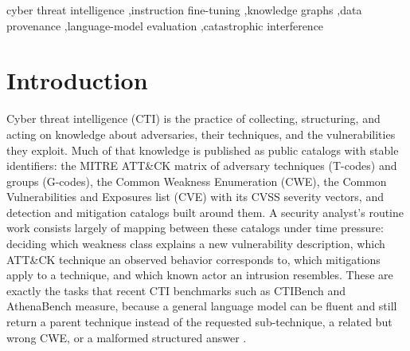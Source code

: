 \documentclass[preprint,12pt,authoryear]{elsarticle}
\makeatletter
\def\els@prelimauthors{}%
\newenvironment{highlights}{%
    \global\setbox\els@hlbox=\vbox\bgroup\hsize=\textwidth\def\baselinestretch{1}%
    \noindent{\Large Highlights}\par\vskip12pt
    \noindent\textbf{\@title}\par\vskip6pt
    \noindent{\let\corref\@gobble\let\fnref\@gobble\let\tnoteref\@gobble
      \def\els@prelimsep{\def\els@prelimsep{, }}\els@prelimauthors}\par\medskip
    \begin{itemize}}{\end{itemize}\egroup}%
\makeatother
\begin{document}
\begin{frontmatter}

\begin{keyword}
cyber threat intelligence \sep instruction fine-tuning \sep knowledge graphs \sep data provenance \sep language-model evaluation \sep catastrophic interference
\end{keyword}

\end{frontmatter}

\linenumbers

\section{Introduction}\label{sec:intro}
Cyber threat intelligence (CTI) is the practice of collecting, structuring, and acting on knowledge about adversaries, their techniques, and the vulnerabilities they exploit. Much of that knowledge is published as public catalogs with stable identifiers: the MITRE ATT\&CK matrix of adversary techniques (T-codes) and groups (G-codes), the Common Weakness Enumeration (CWE), the Common Vulnerabilities and Exposures list (CVE) with its CVSS severity vectors, and detection and mitigation catalogs built around them. A security analyst's routine work consists largely of mapping between these catalogs under time pressure: deciding which weakness class explains a new vulnerability description, which ATT\&CK technique an observed behavior corresponds to, which mitigations apply to a technique, and which known actor an intrusion resembles. These are exactly the tasks that recent CTI benchmarks such as CTIBench and AthenaBench measure, because a general language model can be fluent and still return a parent technique instead of the requested sub-technique, a related but wrong CWE, or a malformed structured answer \citep{alam2024ctibench,alam2025athenabench}.
\end{document}
